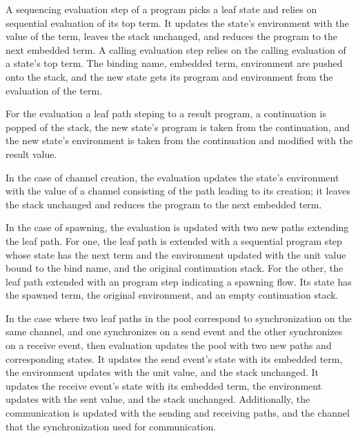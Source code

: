\documentclass[letterpaper, 11pt]{extarticle}
\begin{document}
A sequencing evaluation step of a program picks a leaf state and relies on
sequential evaluation of its top term. It updates the state's environment with the
value of the term, leaves the stack unchanged, and reduces the program to the next
embedded term. A calling evaluation step relies on the calling evaluation of a state's top
term. The binding name, embedded term, environment are pushed onto the stack, and the new
state gets its program and environment from the evaluation of the term. 

For the evaluation a leaf path steping to a result program, a continuation is popped of the
stack, the new state's program is taken from the continuation, and the new state's environment
is taken from the continuation and modified with the result value.

In the case of channel creation, the evaluation updates the state's environment with the
value of a channel consisting of the path leading to its creation; it leaves the stack
unchanged and reduces the program to the next embedded term.

In the case of spawning, the evaluation is updated with two
new paths extending the leaf path.  For one, the leaf path is extended with a sequential
program step whose state has the next term and the environment updated
with the unit value bound to
the bind name, and the original continuation stack. For the other, the leaf path
extended with an program step indicating a spawning flow.  Its state has the spawned
term, the original environment, and an empty continuation stack. 

In the case where two leaf paths in the pool correspond to synchronization on the same channel,
and one synchronizes on a send event and the other synchronizes on a receive event, then
evaluation updates the pool with two new paths and corresponding states.
It updates the send event's state with its embedded term, the environment updates with the unit
value, and the stack unchanged.  It updates the receive event's state with its embedded term, the
environment updates with the sent value, and the stack unchanged.
Additionally, the communication is updated with the sending and receiving paths, and the channel
that the synchronization used for communication. 
\end{document}
